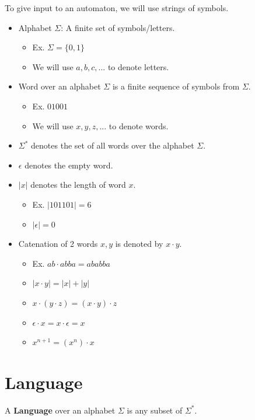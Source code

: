 \documentclass{report}
\begin{document}
To give input to an automaton, we will use strings of symbols.
\begin{itemize}[leftmargin=0.2in]
  \item Alphabet $\Sigma$: A finite set of symbols/letters.
        \begin{itemize}
          \item Ex. $\Sigma = \{0,1\}$
          \item We will use $a,b,c,...$ to denote letters.
        \end{itemize}
  \item Word over an alphabet $\Sigma$ is a finite sequence of symbols from $\Sigma$.
        \begin{itemize}[leftmargin=0.2in]
          \item Ex. $01001$
          \item We will use $x,y,z,...$ to denote words.
        \end{itemize}
  \item $\Sigma^*$ denotes the set of all words over the alphabet $\Sigma$.
  \item $\epsilon$ denotes the empty word.
  \item $|x|$ denotes the length of word $x$.
        \begin{itemize}[leftmargin=0.2in]
          \item Ex. $|101101| = 6$
          \item $|\epsilon| = 0$
        \end{itemize}
  \item Catenation of 2 words $x,y$ is denoted by $x \cdot y$.
        \begin{itemize}[leftmargin=0.2in]
          \item Ex. $ab \cdot abba = ababba$
          \item $|x \cdot y| = |x| + |y|$
          \item $x\cdot (y \cdot z) = (x \cdot y) \cdot z$
          \item $\epsilon \cdot x = x \cdot \epsilon = x$
          \item $x^{n+1} = (x^n) \cdot x$
        \end{itemize}
\end{itemize}

\section{Language}

A \textbf{Language} over an alphabet $\Sigma$ is any subset of $\Sigma^*$.
\end{document}
